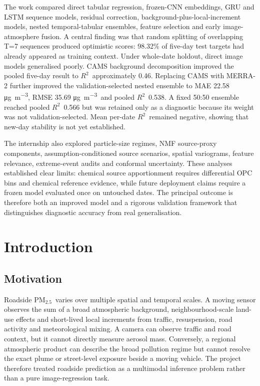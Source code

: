\documentclass[11pt,a4paper,oneside]{report}
\newcommand{\pmtwo}{PM$_{2.5}$}
\newcommand{\ugm}{\si{\micro\gram\per\cubic\metre}}
\newcommand{\Rtwo}{$R^2$}
\begin{document}
The work compared direct tabular regression, frozen-CNN embeddings, GRU and LSTM
sequence models, residual correction, background-plus-local-increment models,
nested temporal-tabular ensembles, feature selection and early image-atmosphere
fusion. A central finding was that random splitting of overlapping T=7 sequences
produced optimistic scores: 98.32\% of five-day test targets had already appeared
as training context. Under whole-date holdout, direct image models generalised
poorly. CAMS background decomposition improved the pooled five-day result to
\Rtwo\ approximately 0.46. Replacing CAMS with MERRA-2 further improved the
validation-selected nested ensemble to MAE 22.58 \ugm, RMSE 35.69 \ugm\ and pooled
\Rtwo\ 0.538. A fixed 50:50 ensemble reached pooled \Rtwo\ 0.566 but was retained
only as a diagnostic because its weight was not validation-selected. Mean per-date
\Rtwo\ remained negative, showing that new-day stability is not yet established.

The internship also explored particle-size regimes, NMF source-proxy components,
assumption-conditioned source scenarios, spatial variograms, feature relevance,
extreme-event audits and conformal uncertainty. These analyses established clear
limits: chemical source apportionment requires differential OPC bins and chemical
reference evidence, while future deployment claims require a frozen model evaluated
once on untouched dates. The principal outcome is therefore both an improved model
and a rigorous validation framework that distinguishes diagnostic accuracy from
real generalisation.

\tableofcontents
\listoffigures
\listoftables
\clearpage
{}

\chapter{Introduction}

\section{Motivation}
Roadside \pmtwo\ varies over multiple spatial and temporal scales. A moving sensor
observes the sum of a broad atmospheric background, neighbourhood-scale land-use
effects and short-lived local increments from traffic, resuspension, road activity
and meteorological mixing. A camera can observe traffic and road context, but it
cannot directly measure aerosol mass. Conversely, a regional atmospheric product
can describe the broad pollution regime but cannot resolve the exact plume or
street-level exposure beside a moving vehicle. The project therefore treated
roadside prediction as a multimodal inference problem rather than a pure
image-regression task.
\end{document}
